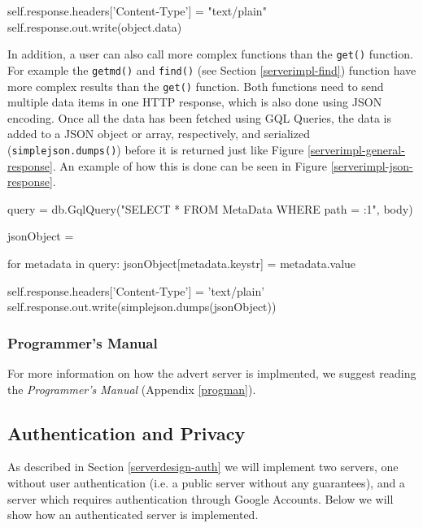 \begin{figure*}[ht] %
\begin{center}
\begin{code}
self.response.headers['Content-Type'] = "text/plain"
self.response.out.write(object.data)
\end{code}
\caption{HTTP Response.\label{serverimpl-general-response}}
\end{center}
\end{figure*}

In addition, a user can also call more complex functions than the
\texttt{get()} function. For example the \texttt{getmd()} and \texttt{find()}
(see Section \ref{serverimpl-find}) function have more complex results than the
\texttt{get()} function. Both functions need to send multiple data items in one
HTTP response, which is also done using JSON encoding. Once all the data has been
fetched using GQL Queries, the data is added to a JSON object or array,
respectively, and serialized (\texttt{simplejson.dumps()}) before it is returned
just like Figure \ref{serverimpl-general-response}. An example of how this is
done can be seen in Figure \ref{serverimpl-json-response}.

\begin{figure*}[ht] %
\begin{center}
\begin{code}
query = db.GqlQuery("SELECT * FROM MetaData WHERE path = :1", body)

jsonObject = {}

for metadata in query:
  jsonObject[metadata.keystr] = metadata.value
  
self.response.headers['Content-Type'] = 'text/plain'
self.response.out.write(simplejson.dumps(jsonObject)) 
\end{code}
\caption{HTTP Response.\label{serverimpl-json-response}}
\end{center}
\end{figure*}

\subsubsection{Programmer's Manual}
For more information on how the advert server is implmented, we suggest reading
the \emph{Programmer's Manual} (Appendix \ref{progman}).

\subsection{Authentication and Privacy}
As described in Section \ref{serverdesign-auth} we will implement two servers,
one without user authentication (i.e. a public server without any guarantees),
and a server which requires authentication through Google Accounts. Below we
will show how an authenticated server is implemented.

